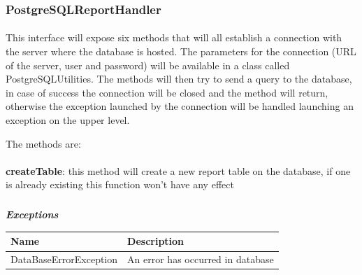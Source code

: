 				\subsubsection{PostgreSQLReportHandler}
					\paragraph{}
						This interface will expose six methods that will all establish a connection with the server where the database is hosted. The parameters for the connection (URL of the server, user and password) will be available in a class called PostgreSQLUtilities. The methods will then try to send a query to the database, in case of success the connection will be closed and the method will return, otherwise the exception launched by the connection will be handled launching an exception on the upper level.
						
						The methods are:
						
						\paragraph{}
							\textbf{createTable}: this method will create a new report table on the database, if one is already existing this function won't have any effect
							\subparagraph{}	
							\textit{\textbf{Exceptions}}
								\begin{table}[!h]
									\begin{tabular}{L{0.3\textwidth}L{0.3\textwidth}}
										\toprule
										Name & Description \\
										\midrule
								  		DataBaseErrorException & An error has occurred in database \\
								 		\bottomrule
									\end{tabular}
								\end{table} \\
